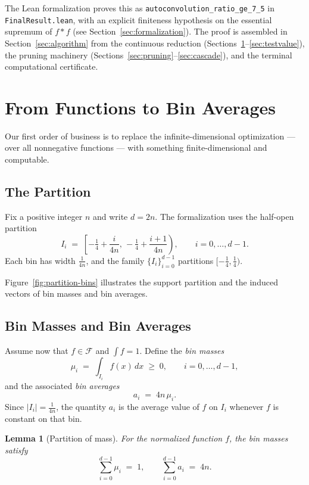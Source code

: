 \documentclass[11pt, letterpaper]{article}
\theoremstyle{paperplain}
\newtheorem{lemma}[theorem]{Lemma}
\theoremstyle{paperdef}
\begin{document}
The Lean formalization proves this as
\texttt{autoconvolution\_ratio\_ge\_7\_5}
in \texttt{FinalResult.lean}, with an explicit finiteness
hypothesis on the essential supremum of $f*f$
(see Section~\ref{sec:formalization}).
The proof is assembled in Section~\ref{sec:algorithm} from the continuous
reduction (Sections~\ref{sec:bin}--\ref{sec:testvalue}), the pruning
machinery (Sections~\ref{sec:pruning}--\ref{sec:cascade}), and the
terminal computational certificate.


\section{From Functions to Bin Averages}\label{sec:bin}

Our first order of business is to replace the infinite-dimensional
optimization --- over all nonnegative functions --- with something
finite-dimensional and computable.

\subsection{The Partition}

Fix a positive integer $n$ and write $d=2n$.  The formalization uses
the half-open partition
\[
  I_i
  \;=\;
  \left[-\tfrac14 + \frac{i}{4n},\,
        -\tfrac14 + \frac{i+1}{4n}\right),
  \qquad i=0,\dots,d-1.
\]
Each bin has width $\tfrac{1}{4n}$, and the family $\{I_i\}_{i=0}^{d-1}$
partitions $[-\tfrac14,\tfrac14)$.

Figure~\ref{fig:partition-bins} illustrates the support partition and
the induced vectors of bin masses and bin averages.

\subsection{Bin Masses and Bin Averages}

Assume now that $f\in\mathcal{F}$ and $\int f = 1$.  Define the
\emph{bin masses}
\[
  \mu_i \;=\; \int_{I_i} f(x)\,dx \;\ge\; 0,
  \qquad i=0,\dots,d-1,
\]
and the associated \emph{bin averages}
\[
  a_i \;=\; 4n\,\mu_i.
\]
Since $|I_i|=\tfrac{1}{4n}$, the quantity $a_i$ is the average value
of $f$ on $I_i$ whenever $f$ is constant on that bin.

\begin{lemma}[Partition of mass]
\label{lem:sum-bin-masses}
For the normalized function $f$, the bin masses satisfy
\[
  \sum_{i=0}^{d-1} \mu_i \;=\; 1,
  \qquad
  \sum_{i=0}^{d-1} a_i \;=\; 4n.
\]
\end{lemma}
\end{document}
